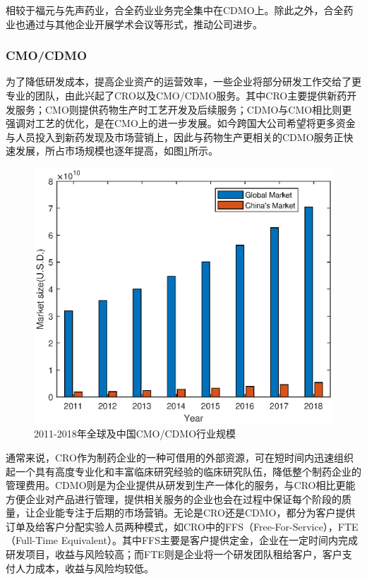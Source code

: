 \documentclass{apa6}
\begin{document}
			相较于福元与先声药业，合全药业业务完全集中在CDMO上。除此之外，合全药业也通过与其他企业开展学术会议等形式，推动公司进步。
			
			
			
			\subsubsection{CMO/CDMO}
			为了降低研发成本，提高企业资产的运营效率，一些企业将部分研发工作交给了更专业的团队，由此兴起了CRO以及CMO/CDMO服务。其中CRO主要提供新药开发服务；CMO则提供药物生产时工艺开发及后续服务；CDMO与CMO相比则更强调对工艺的优化，是在CMO上的进一步发展。如今跨国大公司希望将更多资金与人员投入到新药发现及市场营销上，因此与药物生产更相关的CDMO服务正快速发展，所占市场规模也逐年提高，如图\ref{fig:fig4}所示\citep{RN25}。
			
			\begin{figure}
				\centering
				\includegraphics[width=1.0\linewidth]{fig4}
				\caption{2011-2018年全球及中国CMO/CDMO行业规模}
				\label{fig:fig4}
			\end{figure}
			
			通常来说，CRO作为制药企业的一种可借用的外部资源，可在短时间内迅速组织起一个具有高度专业化和丰富临床研究经验的临床研究队伍，降低整个制药企业的管理费用\citep{RN10}。CDMO则是为企业提供从研发到生产一体化的服务，与CRO相比更能方便企业对产品进行管理，提供相关服务的企业也会在过程中保证每个阶段的质量，让企业能专注于后期的市场营销。无论是CRO还是CDMO，都分为客户提供订单及给客户分配实验人员两种模式，如CRO中的FFS（Free-For-Service），FTE（Full-Time Equivalent）。其中FFS主要是客户提供定金，企业在一定时间内完成研发项目，收益与风险较高；而FTE则是企业将一个研发团队租给客户，客户支付人力成本，收益与风险均较低。
			
\end{document}
